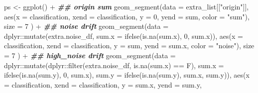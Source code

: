 \documentclass[
]{article}
\newenvironment{Shaded}{\begin{snugshade}}{\end{snugshade}}
\newcommand{\AttributeTok}[1]{\textcolor[rgb]{0.77,0.63,0.00}{#1}}
\newcommand{\DecValTok}[1]{\textcolor[rgb]{0.00,0.00,0.81}{#1}}
\newcommand{\DocumentationTok}[1]{\textcolor[rgb]{0.56,0.35,0.01}{\textbf{\textit{#1}}}}
\newcommand{\FunctionTok}[1]{\textcolor[rgb]{0.00,0.00,0.00}{#1}}
\newcommand{\NormalTok}[1]{#1}
\newcommand{\OtherTok}[1]{\textcolor[rgb]{0.56,0.35,0.01}{#1}}
\newcommand{\SpecialCharTok}[1]{\textcolor[rgb]{0.00,0.00,0.00}{#1}}
\newcommand{\StringTok}[1]{\textcolor[rgb]{0.31,0.60,0.02}{#1}}
\begin{document}
\begin{Shaded}
\begin{Highlighting}[]
\NormalTok{    ps }\OtherTok{\textless{}{-}} \FunctionTok{ggplot}\NormalTok{() }\SpecialCharTok{+}
        \DocumentationTok{\#\# origin sum}
        \FunctionTok{geom\_segment}\NormalTok{(}\AttributeTok{data =}\NormalTok{ extra\_list[[}\StringTok{"origin"}\NormalTok{]],}
                     \FunctionTok{aes}\NormalTok{(}\AttributeTok{x =}\NormalTok{ classification,}
                         \AttributeTok{xend =}\NormalTok{ classification,}
                         \AttributeTok{y =} \DecValTok{0}\NormalTok{,}
                         \AttributeTok{yend =}\NormalTok{ sum,}
                         \AttributeTok{color =} \StringTok{"sum"}\NormalTok{),}
                     \AttributeTok{size =} \DecValTok{7}
\NormalTok{                     ) }\SpecialCharTok{+}
        \DocumentationTok{\#\# noise drift}
        \FunctionTok{geom\_segment}\NormalTok{(}\AttributeTok{data =}\NormalTok{ dplyr}\SpecialCharTok{::}\FunctionTok{mutate}\NormalTok{(extra.noise\_df,}
                                          \AttributeTok{sum.x =} \FunctionTok{ifelse}\NormalTok{(}\FunctionTok{is.na}\NormalTok{(sum.x), }\DecValTok{0}\NormalTok{, sum.x)),}
                     \FunctionTok{aes}\NormalTok{(}\AttributeTok{x =}\NormalTok{ classification,}
                         \AttributeTok{xend =}\NormalTok{ classification,}
                         \AttributeTok{y =}\NormalTok{ sum,}
                         \AttributeTok{yend =}\NormalTok{ sum.x,}
                         \AttributeTok{color =} \StringTok{"noise"}\NormalTok{),}
                     \AttributeTok{size =} \DecValTok{7}
\NormalTok{                     ) }\SpecialCharTok{+}
        \DocumentationTok{\#\# high\_noise drift}
        \FunctionTok{geom\_segment}\NormalTok{(}\AttributeTok{data =}\NormalTok{ dplyr}\SpecialCharTok{::}\FunctionTok{mutate}\NormalTok{(dplyr}\SpecialCharTok{::}\FunctionTok{filter}\NormalTok{(extra.noise\_df, }\FunctionTok{is.na}\NormalTok{(sum.x) }\SpecialCharTok{==}\NormalTok{ F),}
                                          \AttributeTok{sum.x =} \FunctionTok{ifelse}\NormalTok{(}\FunctionTok{is.na}\NormalTok{(sum.y), }\DecValTok{0}\NormalTok{, sum.x),}
                                          \AttributeTok{sum.y =} \FunctionTok{ifelse}\NormalTok{(}\FunctionTok{is.na}\NormalTok{(sum.y), sum.x, sum.y)),}
                     \FunctionTok{aes}\NormalTok{(}\AttributeTok{x =}\NormalTok{ classification,}
                         \AttributeTok{xend =}\NormalTok{ classification,}
                         \AttributeTok{y =}\NormalTok{ sum.x,}
                         \AttributeTok{yend =}\NormalTok{ sum.y,}

\end{Highlighting}
\end{Shaded}
\end{document}
